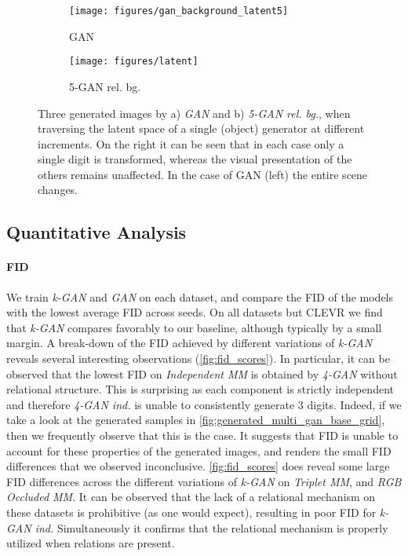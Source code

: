 \documentclass{article}
\begin{document}
\begin{figure}
\begin{subfigure}{.5\textwidth}
  \centering
  \texttt{[image: figures/gan\_background\_latent5]}
  \caption{GAN}
  \label{fig:latent_gan}
\end{subfigure}%
\begin{subfigure}{.5\textwidth}
  \centering
  \texttt{[image: figures/latent]}
  \caption{5-GAN rel. bg.}
  \label{fig:latent_multiganbackground}
\end{subfigure}
\caption{Three generated images by a) \emph{GAN} and b) \emph{5-GAN rel. bg.}, when traversing the latent space of a single (object) generator at different increments. On the right it can be seen that in each case only a single digit is transformed, whereas the visual presentation of the others remains unaffected.
In the case of GAN (left) the entire scene changes.}
\label{fig:relational}
\end{figure}\subsection{Quantitative Analysis}\label{subsection:comparison}\paragraph{FID} 
We train \emph{k-GAN} and \emph{GAN} on each dataset, and compare the FID of the models with the lowest average FID across seeds.
On all datasets but CLEVR we find that \emph{k-GAN} compares favorably to our baseline, although typically by a small margin.
A break-down of the FID achieved by different variations of \emph{k-GAN} reveals several interesting observations (\autoref{fig:fid_scores}).
In particular, it can be observed that the lowest FID on \emph{Independent MM} is obtained by \emph{4-GAN} without relational structure.
This is surprising as each component is strictly independent and therefore \emph{4-GAN ind.} is unable to consistently generate 3 digits.
Indeed, if we take a look at the generated samples in \autoref{fig:generated_multi_gan_base_grid}, then we frequently observe that this is the case.
It suggests that FID is unable to account for these properties of the generated images, and renders the small FID differences that we observed inconclusive. 
\autoref{fig:fid_scores} does reveal some large FID differences across the different variations of \emph{k-GAN} on \emph{Triplet MM}, and \emph{RGB Occluded MM}.
It can be observed that the lack of a relational mechanism on these datasets is prohibitive (as one would expect), resulting in poor FID for \emph{k-GAN ind.}
Simultaneously it confirms that the relational mechanism is properly utilized when relations are present. 
\end{document}
